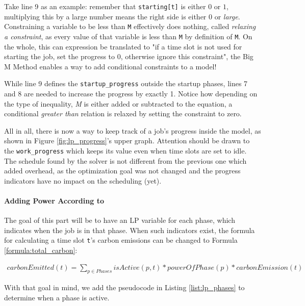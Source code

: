 Take line 9 as an example: 
remember that \verb|starting[t]| is either $0$ or $1$, multiplying this by a large number means the right side is either $0$ or \emph{large}. 
Constraining a variable to be less than \verb|M| effectively does nothing, called \emph{relaxing a constraint}, as every value of that variable is less than \verb|M| by definition of \verb|M|. 
On the whole, this can expression be translated to "if a time slot is not used for starting the job, set the progress to 0, otherwise ignore this constraint", the Big M Method enables a way to add conditional constraints to a model!

While line 9 defines the \verb|startup_progress| outside the startup phases, lines 7 and 8 are needed to increase the progress by exactly 1. 
Notice how depending on the type of inequality, \emph{M} is either added or subtracted to the equation, a conditional \emph{greater than} relation is relaxed by setting the constraint to zero.

All in all, there is now a way to keep track of a job's progress inside the model, as shown in Figure \ref{fig:lp_progress}'s upper graph. Attention should be drawn to the \verb|work_progress| which keeps its value even when time slots are set to idle. 
The schedule found by the solver is not different from the previous one which added overhead, as the optimization goal was not changed and the progress indicators have no impact on the scheduling (yet).

\newpage
\paragraph{Adding Power According to \modelname}

The goal of this part will be to have an LP variable for each phase, which indicates when the job is in that phase.
When such indicators exist, the formula for calculating a time slot \verb|t|'s carbon emissions can be changed to Formula \ref{formula:total_carbon}:

\begin{align}
    \label{formula:total_carbon}
    carbonEmitted(t) = \sum_{p \in Phases} isActive(p, t) * powerOfPhase(p) * carbonEmission(t)
\end{align}

With that goal in mind, we add the pseudocode in Listing \ref{list:lp_phases} to determine when a phase is active. 

